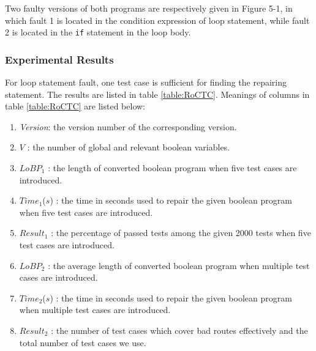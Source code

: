 \documentclass[10pt,journal,final,]{article}
\theoremstyle{definition}
\begin{document}
Two faulty versions of both programs are respectively given in Figure 5-1, in which fault 1 is located in the condition expression of loop statement, while fault 2 is located in the \lstinline|if| statement in the loop body.


\subsubsection{Experimental Results}
For loop statement fault, one test case is sufficient for finding the repairing statement.
The results are listed in table \ref{table:RoCTC}. Meanings of columns in table \ref{table:RoCTC} are listed below:

\begin{enumerate}
\item {\it Version}: the version number of the corresponding version.
\item $V$             : the number of global and relevant boolean variables.
\item $LoBP_{1}$      : the length of converted boolean program when five test cases are introduced.
\item $Time_{1}$($s$) : the time in seconds used to repair the given boolean program when five test cases are introduced.
\item $Result_{1}$    : the percentage of passed tests among the given 2000 tests when five test cases are introduced.
\item $LoBP_{2}$      : the average length of converted boolean program when multiple test cases are introduced.
\item $Time_{2}$($s$) : the time in seconds used to repair the given boolean program when multiple test cases are introduced.
\item $Result_{2}$    : the number of test cases which cover bad routes effectively and the total number of test cases we use.
\end{enumerate}
\end{document}

